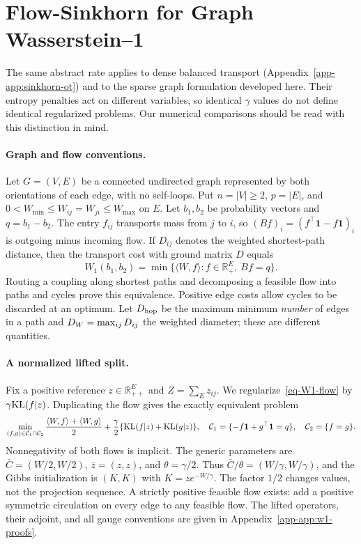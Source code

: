 \section{Flow-Sinkhorn for Graph Wasserstein--1}\label{sec:applications}
The same abstract rate applies to dense balanced transport (Appendix~\ref{app-app:sinkhorn-ot}) and to the sparse graph formulation developed here. Their entropy penalties act on different variables, so identical $\gamma$ values do not define identical regularized problems. Our numerical comparisons should be read with this distinction in mind.

\paragraph{Graph and flow conventions.}\label{subsec-w1-graphs}
Let $G=(V,E)$ be a connected undirected graph represented by both orientations of each edge, with no self-loops. Put $n=|V|\geq2$, $p=|E|$, and $0<W_{\min}\leq W_{ij}=W_{ji}\leq W_{\max}$ on $E$. Let $b_1,b_2$ be probability vectors and $q=b_1-b_2$. The entry $f_{ij}$ transports mass from $j$ to $i$, so $(Bf)_i=(f^\top\mathbf1-f\mathbf1)_i$ is outgoing minus incoming flow. If $D_{ij}$ denotes the weighted shortest-path distance, then the transport cost with ground matrix $D$ equals
\begin{equation}\label{eq-W1-flow}
 W_1(b_1,b_2)=\min\{\langle W,f\rangle:f\in\mathbb R_+^E,\ Bf=q\}.
\end{equation}
Routing a coupling along shortest paths and decomposing a feasible flow into paths and cycles prove this equivalence. Positive edge costs allow cycles to be discarded at an optimum. Let $D_{\mathrm{hop}}$ be the maximum minimum \emph{number} of edges in a path and $D_W=\max_{ij}D_{ij}$ the weighted diameter; these are different quantities.

\paragraph{A normalized lifted split.}\label{subsec-splitting-constr}
Fix a positive reference $z\in\mathbb R_{++}^E$ and $Z=\sum_Ez_{ij}$. We regularize~\eqref{eq-W1-flow} by $\gamma\mathrm{KL}(f|z)$. Duplicating the flow gives the exactly equivalent problem
\begin{equation}\label{eq-W1-flow-lifted}
 \min_{(f,g)\in\mathcal C_1\cap\mathcal C_2}
 \frac{\langle W,f\rangle+\langle W,g\rangle}{2}
 +\frac{\gamma}{2}\{\mathrm{KL}(f|z)+\mathrm{KL}(g|z)\},\quad
 \mathcal C_1=\{-f\mathbf1+g^\top\mathbf1=q\},\quad
 \mathcal C_2=\{f=g\}.
\end{equation}
Nonnegativity of both flows is implicit. The generic parameters are $\bar C=(W/2,W/2)$, $\bar z=(z,z)$, and $\theta=\gamma/2$. Thus $\bar C/\theta=(W/\gamma,W/\gamma)$, and the Gibbs initialization is $(K,K)$ with $K=z e^{-W/\gamma}$. The factor $1/2$ changes values, not the projection sequence. A strictly positive feasible flow exists: add a positive symmetric circulation on every edge to any feasible flow. The lifted operators, their adjoint, and all gauge conventions are given in Appendix~\ref{app-app:w1-proofs}.

